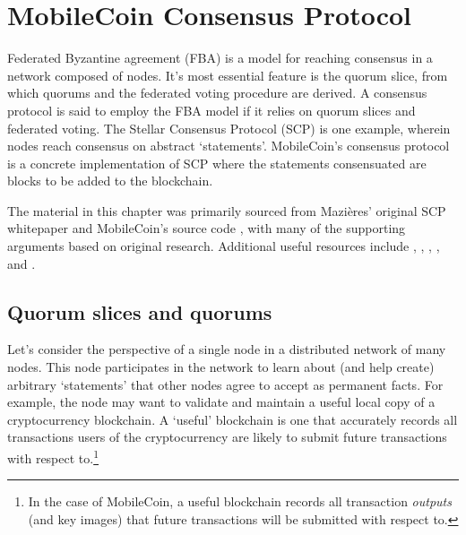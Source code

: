 \chapter{MobileCoin Consensus Protocol}
\label{chapter:consensus}

Federated Byzantine agreement (FBA) is a model for reaching consensus in a network composed of nodes. It's most essential feature is the quorum slice, from which quorums and the federated voting procedure are derived. A consensus protocol is said to employ the FBA model if it relies on quorum slices and federated voting. The Stellar Consensus Protocol (SCP) is one example, wherein nodes reach consensus on abstract `statements'. MobileCoin's consensus protocol is a concrete implementation of SCP where the statements consensuated are blocks to be added to the blockchain.

The material in this chapter was primarily sourced from Mazi{\`e}res' original SCP whitepaper \cite{stellar-consensus-protocol} and MobileCoin's source code \cite{mobilecoin-source-code}, with many of the supporting arguments based on original research. Additional useful resources include \cite{simplified-scp}, \cite{understanding-scp-glickstein}, \cite{fast-secure-global-payments-stellar}, \cite{safety-liveness-stellar}, and \cite{scp-ietf-draft}.



\section{Quorum slices and quorums}
\label{sec:consensus-quorum-slices-quorums}

Let's consider the perspective of a single node in a distributed network of many nodes. This node participates in the network to learn about (and help create) arbitrary `statements' that other nodes agree to accept as permanent facts. For example, the node may want to validate and maintain a useful local copy of a cryptocurrency blockchain. A `useful' blockchain is one that accurately records all transactions users of the cryptocurrency are likely to submit future transactions with respect to.\footnote{In the case of MobileCoin, a useful blockchain records all transaction {\em outputs} (and key images) that future transactions will be submitted with respect to.}

